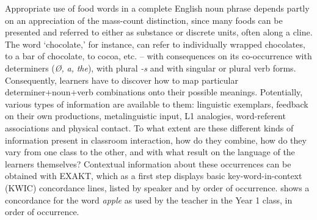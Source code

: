 \documentclass[output=paper,colorlinks,citecolor=brown,modfonts,nonflat]{../langscibook}
\begin{document}
Appropriate use of food words in a complete English noun phrase depends partly on an appreciation of the mass-count distinction, since many foods can be presented and referred to either as substance or discrete units, often along a cline. The word ‘chocolate,’ for instance, can refer to individually wrapped chocolates, to a bar of chocolate, to cocoa, etc. – with consequences on its co-occurrence with determiners (\textit{Ø,} \textit{a,} \textit{the}), with plural \textit{{}-s} and with singular or plural verb forms. Consequently, learners have to discover how to map particular determiner+noun+verb combinations onto their possible meanings. Potentially, various types of information are available to them: linguistic exemplars, feedback on their own productions, metalinguistic input, L1 analogies, word-referent associations and physical contact. To what extent are these different kinds of information present in classroom interaction, how do they combine, how do they vary from one class to the other, and with what result on the language of the learners themselves? Contextual information about these occurrences can be obtained with EXAKT, which as a first step displays basic key-word-in-context (KWIC) concordance lines, listed by speaker and by order of occurrence.  shows a concordance for the word \textit{apple} as used by the teacher in the Year 1 class, in order of occurrence.
\end{document}

